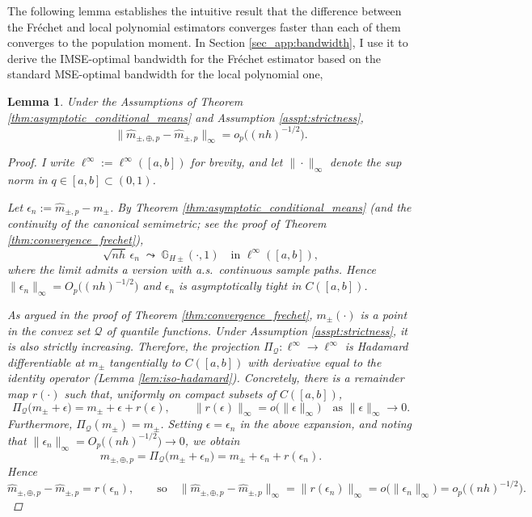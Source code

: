 \documentclass[12pt]{article}
\newtheorem{lemma}{Lemma}
\begin{document}
The following lemma establishes the intuitive result that the difference between the Fr\'echet and local polynomial estimators converges faster than each of them converges to the population moment. In Section \ref{sec_app:bandwidth}, I use it to derive the IMSE-optimal bandwidth for the Fr\'echet estimator based on the standard MSE-optimal bandwidth for the local polynomial one,
\begin{lemma} \label{lemma:frechet_lp_squeeze}
Under the Assumptions of Theorem \ref{thm:asymptotic_conditional_means} and Assumption \ref{asspt:strictness},
\[
  \bigl\|\hat{m}_{\pm,\oplus,p}-\hat{m}_{\pm,p}\bigr\|_{\infty}
  =
  o_p\bigl((nh)^{-1/2}\bigr).
\]

\begin{proof}
I write $\ell^\infty:=\ell^\infty([a,b])$ for brevity, and let $\|\cdot\|_{\infty}$ denote the sup norm in $q\in[a,b]\subset(0,1)$.  

Let $\epsilon_n:=\hat{m}_{\pm,p}-m_{\pm}$. By Theorem \ref{thm:asymptotic_conditional_means} (and the continuity of the canonical semimetric; see the proof of Theorem \ref{thm:convergence_frechet}), 
\[
\sqrt{nh}\,\epsilon_n \;\leadsto\; \mathbb{G}_{H\pm}(\cdot,1)\quad\text{in }\ell^\infty([a,b]),
\]
where the limit admits a version with a.s.\ continuous sample paths. Hence $\|\epsilon_n\|_\infty = O_p\bigl((nh)^{-1/2}\bigr)$ and $\epsilon_n$ is asymptotically tight in $C([a,b])$.

As argued in the proof of Theorem \ref{thm:convergence_frechet}, $m_{\pm}(\cdot)$ is a point in the convex set $\mathcal{Q}$ of quantile functions. Under Assumption \ref{asspt:strictness}, it is also strictly increasing. Therefore, the projection $\Pi_{\mathcal{Q}}\colon \ell^\infty \to \ell^\infty$ is Hadamard differentiable at $m_{\pm}$ tangentially to $C([a,b])$ with derivative equal to the identity operator (Lemma \ref{lem:iso-hadamard}). Concretely, there is a remainder map $r(\cdot)$ such that, uniformly on compact subsets of $C([a,b])$,
\[
\Pi_{\mathcal{Q}}\bigl(m_{\pm}+\epsilon\bigr)
  =
  m_{\pm}
  +
  \epsilon
  +
  r(\epsilon),
  \qquad
  \|r(\epsilon)\|_{\infty}=o\bigl(\|\epsilon\|_{\infty}\bigr)
  \quad\text{as }\|\epsilon\|_{\infty}\to 0.
\]
Furthermore, $\Pi_{\mathcal{Q}}(m_{\pm})=m_{\pm}$. Setting $\epsilon=\epsilon_n$ in the above expansion, and noting that 
$\|\epsilon_n\|_{\infty}=O_p\bigl((nh)^{-1/2}\bigr)\to 0$, we obtain
\[
  \hat{m}_{\pm,\oplus,p}
  =
\Pi_{\mathcal{Q}}\bigl(m_{\pm}+\epsilon_n\bigr)
  =
  m_{\pm} + \epsilon_n + r(\epsilon_n).
\]
Hence
\[
  \hat{m}_{\pm,\oplus,p}
  -
  \hat{m}_{\pm,p}
  =
  r(\epsilon_n),
  \qquad
  \text{so}\quad
  \bigl\|\hat{m}_{\pm,\oplus,p} - \hat{m}_{\pm,p}\bigr\|_{\infty}
  =
  \|r(\epsilon_n)\|_{\infty}
  =
  o \bigl(\|\epsilon_n\|_{\infty}\bigr)
  =
  o_p \bigl((nh)^{-1/2}\bigr).
\]


\end{proof}
\end{lemma}
\end{document}
